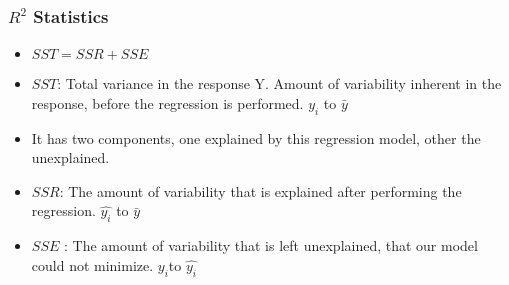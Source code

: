 \begin{frame}[fragile]\frametitle{$R^2$ Statistics}
\begin{itemize}
\item $SST = SSR + SSE$

\item $SST$: Total variance in the response Y. Amount of variability inherent in the response, before the regression is performed. $y_i$ to $\bar{y}$
\item It has two components, one explained by this regression model, other the unexplained.
\item $SSR$: The amount of variability that is explained after performing the regression. $\hat{y_i}$ to $\bar{y}$
\item $SSE$ : The amount of variability that is left unexplained, that our model could not minimize. $y_i$to $\hat{y_i}$

\end{itemize}
\end{frame}







